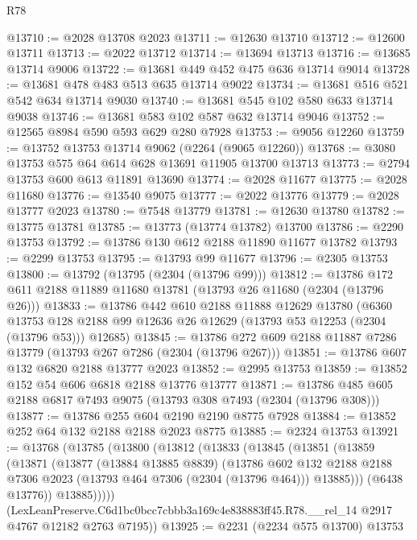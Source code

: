\begin{lexlean}{R78}
\begin{coremodule}
@13710 := @2028 @13708 @2023
@13711 := @12630 @13710
@13712 := @12600 @13711
@13713 := @2022 @13712
@13714 := @13694 @13713
@13716 := @13685 @13714 @9006
@13722 := @13681 @449 @452 @475 @636 @13714 @9014
@13728 := @13681 @478 @483 @513 @635 @13714 @9022
@13734 := @13681 @516 @521 @542 @634 @13714 @9030
@13740 := @13681 @545 @102 @580 @633 @13714 @9038
@13746 := @13681 @583 @102 @587 @632 @13714 @9046
@13752 := @12565 @8984 @590 @593 @629 @280 @7928
@13753 := @9056 @12260
@13759 := @13752 @13753 @13714 @9062 (@2264 (@9065 @12260))
@13768 := @3080 @13753 @575 @64 @614 @628 @13691 @11905 @13700 @13713
@13773 := @2794 @13753 @600 @613 @11891 @13690
@13774 := @2028 @11677
@13775 := @2028 @11680
@13776 := @13540 @9075
@13777 := @2022 @13776
@13779 := @2028 @13777 @2023
@13780 := @7548 @13779
@13781 := @12630 @13780
@13782 := @13775 @13781
@13785 := @13773 (@13774 @13782) @13700
@13786 := @2290 @13753
@13792 := @13786 @130 @612 @2188 @11890 @11677 @13782
@13793 := @2299 @13753
@13795 := @13793 @99 @11677
@13796 := @2305 @13753
@13800 := @13792 (@13795 (@2304 (@13796 @99)))
@13812 := @13786 @172 @611 @2188 @11889 @11680 @13781 (@13793 @26 @11680 (@2304 (@13796 @26)))
@13833 := @13786
    @442
    @610
    @2188
    @11888
    @12629
    @13780
    (@6360 @13753 @128 @2188 @99 @12636 @26 @12629 (@13793 @53 @12253 (@2304 (@13796 @53))) @12685)
@13845 := @13786 @272 @609 @2188 @11887 @7286 @13779 (@13793 @267 @7286 (@2304 (@13796 @267)))
@13851 := @13786 @607 @132 @6820 @2188 @13777 @2023
@13852 := @2995 @13753
@13859 := @13852 @152 @54 @606 @6818 @2188 @13776 @13777
@13871 := @13786 @485 @605 @2188 @6817 @7493 @9075 (@13793 @308 @7493 (@2304 (@13796 @308)))
@13877 := @13786 @255 @604 @2190 @2190 @8775 @7928
@13884 := @13852 @252 @64 @132 @2188 @2188 @2023 @8775
@13885 := @2324 @13753
@13921 := @13768
    (@13785
      (@13800
        (@13812
          (@13833
            (@13845
              (@13851
                (@13859
                  (@13871
                    (@13877
                      (@13884 @13885 @8839)
                      (@13786
                        @602
                        @132
                        @2188
                        @2188
                        @7306
                        @2023
                        (@13793 @464 @7306 (@2304 (@13796 @464)))
                        @13885)))
                  (@6438 @13776))
                @13885)))))
      (LexLeanPreserve.C6d1bc0bcc7cbbb3a169c4e838883ff45.R78.__rel_14
        @2917
        @4767
        @12182
        @2763
        @7195))
@13925 := @2231 (@2234 @575 @13700) @13753

\end{coremodule}
\end{lexlean}
